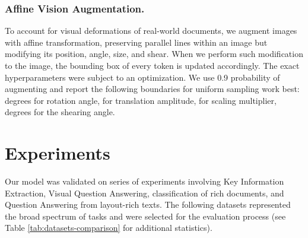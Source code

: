 \documentclass[runningheads]{llncs}
\begin{document}
\subsubsection{Affine Vision Augmentation.}
To account for visual deformations of real-world documents, we augment images with affine transformation, preserving parallel lines within an image but modifying its position, angle, size, and shear. When we perform such modification to the image, the bounding box of every token is updated accordingly.
The exact hyperparameters were subject to an optimization. We use 0.9 probability of augmenting and report the following boundaries for uniform sampling work best:  degrees for rotation angle,  for translation amplitude,  for scaling multiplier,  degrees for the shearing angle.


\section{Experiments}

Our model was validated on series of experiments involving Key Information Extraction, Visual Question Answering, classification of rich documents, and Question Answering from layout-rich texts. The following datasets represented the broad spectrum of tasks and were selected for the evaluation process (see Table \ref{tab:datasets-comparison} for additional statistics).
\end{document}
